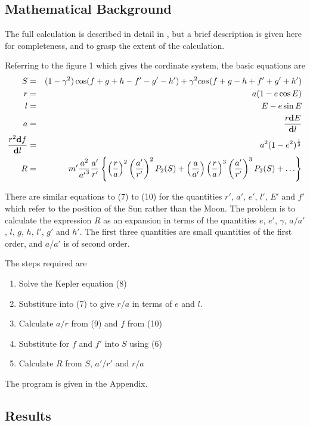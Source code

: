 \subsection{Mathematical Background}

The full calculation is described in detail in \cite{Brown}, but a
brief description is given here for completeness, and to grasp the
extent of the calculation.

Referring to the figure 1 which gives the cordinate system, the basic
equations are
\begin{eqnarray}
S  & = & (1-\gamma ^2)\cos(f + g +h -f' -g' -h')
+ \gamma ^2 cos(f + g -h +f' +g' +h') \\
r & = & a (1 - e \cos E) \\
l & = & E - e \sin E \\
a & = & r {{\bf d} E} \over {{\bf d} l} \\
r ^2 {{\bf d} f} \over {{\bf d} l} & = & a^2 (1 - e^2)^{1 \over 2}\\
R & = & m' {a^2 \over {a'} ^3} {{a'}\over {r
'}} \left \{ \left ({r \over a}\right )^2
\left ({{a'} \over {r'}}\right )^2 P_2(S) +
\left ({a \over {a'}}\right )\left
({r \over a}\right )^3 \left ({{a'} \over {r'}}\right )^3 P_3(S)
+ \ldots \right \}
\end{eqnarray}

There are similar equations to (7) to (10) for the quantities $r'$,
$a'$, $e'$, $l'$, $E'$ and $f'$ which refer to the position of the Sun
rather than the Moon.  The problem is to calculate the expression $R$
as an expansion in terms of the quantities $e$, $e'$, $\gamma$,
$a/a'$, $l$, $g$, $h$, $l'$, $g'$ and $h'$.  The first three
quantities are small quantities of the first order, and $a/a'$ is of
second order.

The steps required are
\begin{enumerate}
\item Solve the Kepler equation (8)
\item Substiture into (7) to give $r/a$ in terms of $e$ and $l$.
\item Calculate $a/r$ from (9) and $f$ from (10)
\item Substitute for $f$ and $f'$ into $S$ using (6)
\item Calculate $R$ from $S$, $a'/r'$ and $r/a$
\end{enumerate}

The program is given in the Appendix.

\subsection{Results}

